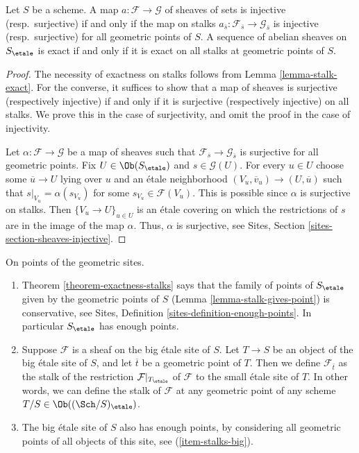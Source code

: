 \begin{theorem}
\label{theorem-exactness-stalks}
Let $S$ be a scheme.
A map $a : \mathcal{F} \to \mathcal{G}$ of sheaves of sets is injective
(resp.\ surjective) if and only if the map on stalks
$a_{\overline{s}} : \mathcal{F}_{\overline{s}} \to \mathcal{G}_{\overline{s}}$
is injective (resp.\ surjective) for all geometric points of $S$.
A sequence of abelian sheaves on $S_\etale$ is exact
if and only if it is exact on all stalks at geometric points of $S$.
\end{theorem}

\begin{proof}
The necessity of exactness on stalks follows from
Lemma \ref{lemma-stalk-exact}.
For the converse, it suffices to show that a map of sheaves is surjective
(respectively injective) if and only if it is surjective (respectively
injective) on all stalks. We prove this in the case of surjectivity, and omit
the proof in the case of injectivity.

\medskip\noindent
Let $\alpha : \mathcal{F} \to \mathcal{G}$ be a map of sheaves such
that $\mathcal{F}_{\overline{s}} \to \mathcal{G}_{\overline{s}}$
is surjective for all geometric points. Fix
$U \in \Ob(S_\etale)$
and $s \in \mathcal{G}(U)$. For every $u \in U$ choose some
$\overline{u} \to U$ lying over $u$ and an \'etale neighborhood
$(V_u , \overline{v}_u) \to (U, \overline{u})$ such that
$s|_{V_u} = \alpha(s_{V_u})$ for some
$s_{V_u} \in \mathcal{F}(V_u)$.
This is possible since $\alpha$ is surjective on
stalks. Then $\{V_u \to U\}_{u \in U}$
is an \'etale covering on which the restrictions of $s$
are in the image of the map $\alpha$.
Thus, $\alpha$ is surjective, see
Sites, Section \ref{sites-section-sheaves-injective}.
\end{proof}

\begin{remarks}
\label{remarks-enough-points}
On points of the geometric sites.
\begin{enumerate}
\item Theorem \ref{theorem-exactness-stalks} says that the family of points
of $S_\etale$ given by the geometric points of $S$
(Lemma \ref{lemma-stalk-gives-point}) is conservative, see
Sites, Definition \ref{sites-definition-enough-points}.
In particular $S_\etale$ has enough points.
\item Suppose $\mathcal{F}$ is a sheaf on the big \'etale site
\label{item-stalks-big}
of $S$. Let $T \to S$ be an object of the big \'etale site of $S$,
and let $\overline{t}$ be a geometric point of $T$. Then we define
$\mathcal{F}_{\overline{t}}$ as the stalk
of the restriction $\mathcal{F}|_{T_\etale}$ of $\mathcal{F}$
to the small \'etale site of $T$. In other words, we can define
the stalk of $\mathcal{F}$ at any geometric point of any
scheme $T/S \in \Ob((\Sch/S)_\etale)$.
\item The big \'etale site of $S$ also has enough points, by
considering all geometric points of all objects of this site, see
(\ref{item-stalks-big}).
\end{enumerate}
\end{remarks}

